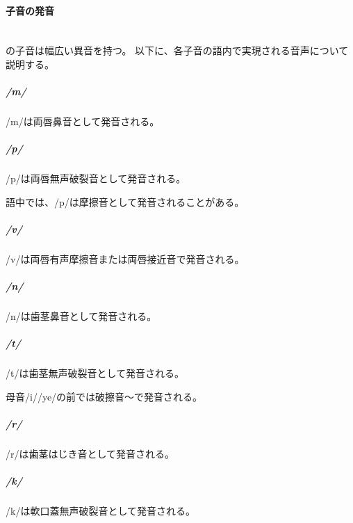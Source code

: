\paragraph{子音の発音}\quad\\
\langname の子音は幅広い異音を持つ。
以下に、各子音の語内で実現される音声について説明する。

\subparagraph{/m/}
/m/は両唇鼻音\textipa{[m]}として発音される。

\subparagraph{/p/}
/p/は両唇無声破裂音\textipa{[p]}として発音される。

語中では、/p/は摩擦音\textipa{[F]}として発音されることがある。

\subparagraph{/v/}
/v/は両唇有声摩擦音\textipa{[B]}または両唇接近音\textipa{[\textlowering{B}]}で発音される。

\subparagraph{/n/}
/n/は歯茎鼻音\textipa{[n]}として発音される。

\subparagraph{/t/}
/t/は歯茎無声破裂音\textipa{[p]}として発音される。

母音/i//ye/の前では破擦音\textipa{[\t{ts}]}～\textipa{[\t{tS}]}で発音される。

\subparagraph{/r/}
/r/は歯茎はじき音\textipa{[R]}として発音される。

\subparagraph{/k/}
/k/は軟口蓋無声破裂音\textipa{[k]}として発音される。
